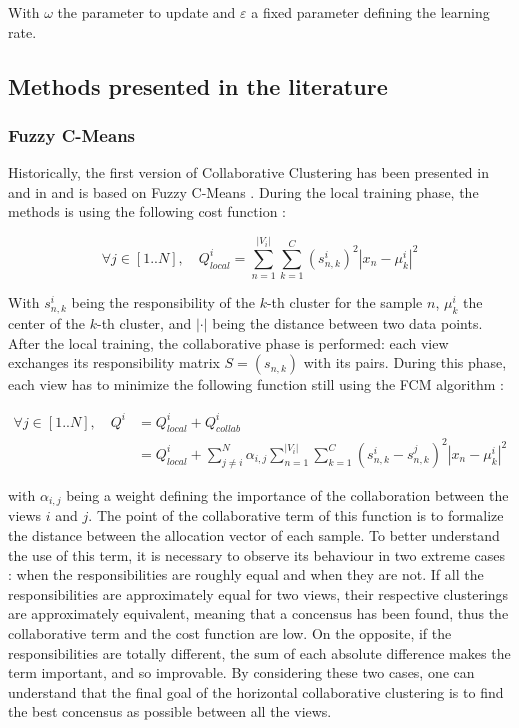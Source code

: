 \documentclass[a4paper]{report}
\begin{document}
    With $\omega$ the parameter to update and $\varepsilon$ a fixed parameter defining the learning rate. 
    
    \subsection{Methods presented in the literature}

    \subsubsection{Fuzzy C-Means}

    Historically, the first version of Collaborative Clustering has been presented in \cite{grozavu2010topological} and in \cite{pedrycz2004fuzzy} and is based on Fuzzy C-Means \cite{bezdek1984fcm}. During the local training phase, the methods is using the following cost function :

    \begin{equation}
        \forall j \in [1..N], \quad Q^i_{local} = \sum_{n=1}^{|V_i|}\sum_{k=1}^C(s_{n,k}^i)^2|x_n - \mu_k^i|^2
        \label{eq:local_fcm}
    \end{equation}

    With $s_{n,k}^i$ being the responsibility of the $k$-th cluster for the sample $n$, $\mu_k^i$ the center of the $k$-th cluster, and $|\cdot|$ being the distance between two data points. After the local training, the collaborative phase is performed: each view exchanges its responsibility matrix $S = (s_{n,k})$ with its pairs. During this phase, each view has to minimize the following function still using the FCM algorithm :

    \begin{align}
        \forall j \in [1..N], \quad Q^i &= Q^i_{local} + Q^i_{collab}\\
        &= Q^i_{local} + \sum_{j\neq i}^N \alpha_{i,j}\sum_{n=1}^{|V_i|}\sum_{k=1}^C(s_{n,k}^i - s_{n,k}^j)^2|x_n-\mu_k^i|^2
    \end{align}
    
    with $\alpha_{i,j}$ being a weight defining the importance of the collaboration between the views $i$ and $j$. The point of the collaborative term of this function is to formalize the distance between the allocation vector of each sample. To better understand the use of this term, it is necessary to observe its behaviour in two extreme cases : when the responsibilities are roughly equal and when they are not. If all the responsibilities are approximately equal for two views, their respective clusterings are approximately equivalent, meaning that a concensus has been found, thus the collaborative term and the cost function are low. On the opposite, if the responsibilities are totally different, the sum of each absolute difference makes the term important, and so improvable. By considering these two cases, one can understand that the final goal of the horizontal collaborative clustering is to find the best concensus as possible between all the views.
\end{document}
